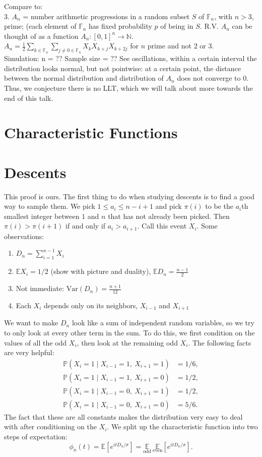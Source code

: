 \documentclass{article}
\newcommand{\f}[2]{\frac{#1}{#2}}
\newcommand{\E}{\mathbb{E}}
\renewcommand{\P}{\mathbb{P}}
\newcommand{\N}{\mathbb{N}}
\newcommand{\F}{\mathbb{F}}
\newcommand{\Var}{\mathrm{Var}}
\begin{document}
		Compare to: \\
		3. $A_n$ = number arithmetic progressions in a random subset $S$ of $\F_n$, with $n>3$, prime; (each element of $\F_n$ has fixed probability $p$ of being in $S$.
	 	R.V. $A_n$ can be thought of as a function $A_n : [0,1]^n \rightarrow \N$. 
$A_n = \f{1}{2} \sum_{k \in \F_n} \sum_{j \neq 0 \in \F_n} X_k X_{k+j} X_{k+2j}$ for $n$ prime and not $2$ or $3$.	 	
	 	\\
	 	Simulation: n = ?? Sample size = ??
	 	See oscillations, within a certain interval the distribution looks normal, but not pointwise: at a certain point, the distance between the normal distribution and distribution of $A_n$ does not converge to 0. Thus, we conjecture there is no LLT, which we will talk about more towards the end of this talk.



	\section*{Characteristic Functions}


	\section*{Descents}

	This proof is ours. The first thing to do when studying descents is to find a good way to sample them. We pick $1 \leq a_i \leq n - i + 1$ and pick $\pi(i)$ to be the $a_i$th smallest integer between $1$ and $n$ that has not already been picked. Then $\pi(i) > \pi(i+1)$ if and only if $a_i > a_{i+1}$. Call this event $X_i$. Some observations:

	\begin{enumerate}[$\bullet$]
		\item
			$D_n = \sum\limits_{i=1}^{n-1} X_i$
		\item
			$\E X_i = 1/2$ (show with picture and duality), $\E D_n = \f{n-1}{2}$
		\item
			Not immediate: $\Var(D_n) = \f{n+1}{12}$
		\item
			Each $X_i$ depends only on its neighbors, $X_{i-1}$ and $X_{i+1}$
	\end{enumerate}

	We want to make $D_n$ look like a sum of independent random variables, so we try to only look at every other term in the sum. To do this, we first condition on the values of all the odd $X_i$, then look at the remaining odd $X_i$. The following facts are very helpful:
	\begin{align*}
		\P(X_i = 1 \mid X_{i-1} = 1,\ X_{i+1} = 1) &= 1/6, \\
		\P(X_i = 1 \mid X_{i-1} = 1,\ X_{i+1} = 0) &= 1/2, \\
		\P(X_i = 1 \mid X_{i-1} = 0,\ X_{i+1} = 1) &= 1/2, \\
		\P(X_i = 1 \mid X_{i-1} = 0,\ X_{i+1} = 0) &= 5/6.
	\end{align*}
	The fact that these are all constants makes the distribution very easy to deal with after conditioning on the $X_i$. We split up the characteristic function into two steps of expectation:
	\[ \phi_n(t) = \E[e^{itD_n/\sigma}] = \underset{\text{odd}}{\E} \ \underset{\text{even}}{\E} [e^{itD_n/\sigma}]. \]
\end{document}
